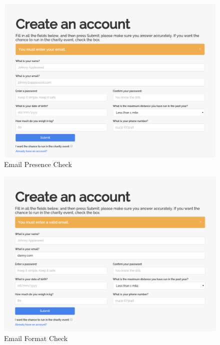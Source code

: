 \documentclass{article}[12pt,a4paper]
\begin{document}
\begin{figure}[h!]
  \includegraphics[scale=0.25]{images/testing/registration_validation/email_presence}
  \caption{Email Presence Check}
\end{figure}

\begin{figure}[h!]
  \includegraphics[scale=0.25]{images/testing/registration_validation/email_format}
  \caption{Email Format Check}
\end{figure}
\end{document}
